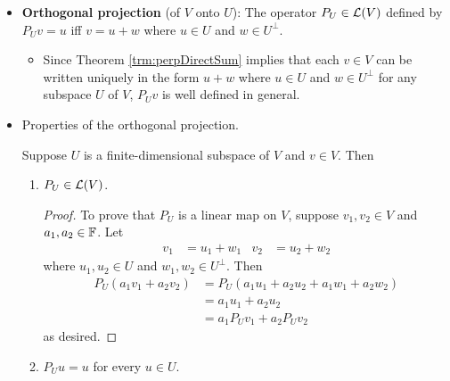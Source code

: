 \documentclass[../main.tex]{subfiles}
\begin{document}
\begin{itemize}
\begin{theorem}
\begin{proof}
            Now suppose that $v\in(U^\perp)^\perp$. By Theorem \ref{trm:perpDirectSum}, we have that $v=u+w$, where $u\in U$ and $w\in U^\perp$. It follows that $v-u=w\in U^\perp$ and, since $v\in(U^\perp)^\perp$ by hypothesis and $u\in(U^\perp)^\perp$ by the first part of the proof, that $v-u\in(U^\perp)^\perp$. Therefore, $v-u\in U^\perp\cap(U^\perp)^\perp\subset\{0\}$, so $v-u=0$ or $v=u\in U$, as desired.
        \end{proof}
    \end{theorem}
    \item \textbf{Orthogonal projection} (of $V$ onto $U$): The operator $P_U\in\mathcal{L}(V)$ defined by $P_Uv=u$ iff $v=u+w$ where $u\in U$ and $w\in U^\perp$.
    \begin{itemize}
        \item Since Theorem \ref{trm:perpDirectSum} implies that each $v\in V$ can be written uniquely in the form $u+w$ where $u\in U$ and $w\in U^\perp$ for any subspace $U$ of $V$, $P_Uv$ is well defined in general.
    \end{itemize}
    \item Properties of the orthogonal projection.
    \begin{theorem}\label{trm:projProperties}
        Suppose $U$ is a finite-dimensional subspace of $V$ and $v\in V$. Then
        \begin{enumerate}[label={\textup{(}\alph*\textup{)}},ref={\thetheorem\alph*}]
            \item \label{trm:projPropertiesa}$P_U\in\mathcal{L}(V)$.
            \begin{proof}
                To prove that $P_U$ is a linear map on $V$, suppose $v_1,v_2\in V$ and $a_1,a_2\in\mathbb{F}$. Let
                \begin{align*}
                    v_1 &= u_1+w_1&
                    v_2 &= u_2+w_2
                \end{align*}
                where $u_1,u_2\in U$ and $w_1,w_2\in U^\perp$. Then
                \begin{align*}
                    P_U(a_1v_1+a_2v_2) &= P_U(a_1u_1+a_2u_2+a_1w_1+a_2w_2)\\
                    &= a_1u_1+a_2u_2\\
                    &= a_1P_Uv_1+a_2P_Uv_2
                \end{align*}
                as desired.
            \end{proof}
            \item \label{trm:projPropertiesb}$P_Uu=u$ for every $u\in U$.

\end{enumerate}
\end{theorem}
\end{itemize}
\end{document}
